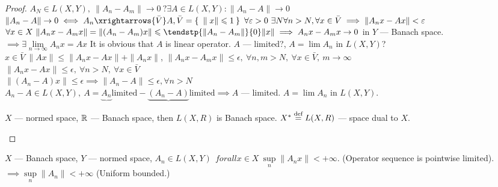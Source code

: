 \begin{proof}
  $A_N \in  L(X ,Y),\ \|A_n - A_m\| \to 0\ ?\exists A \in L(X, Y): \|A_n - A\|
  \to 0$ \\
  $\|A_n - A\| \to 0 \iff A_n \xrightarrows{\bar{V}} A, \bar{V} = \Set{\|x\| \leq
    1}\ \forall \epsilon > 0\ \exists N \forall n > N, \forall x \in \bar{V}
  \implies \|A_nx - Ax\| < \epsilon$ \\
  $\forall x \in X\ \|A_nx - A_mx\| = \|(A_n - A_m)x\| \leq \tendstp{\|A_n - A_m\|}{0} \|x\|
  \implies A_nx - A_mx \to 0$ in $Y$ --- Banach space.
  $\implies \exists \lim\limits_{n \to \infty}A_nx = Ax$
  It is obvious that $A$ is linear operator. $A$ --- limited?, $A = \lim A_n$ in
  $L(X, Y)$?  \\
  $x \in \bar{V}\ \|Ax\| \leq \|A_nx - Ax\| + \|A_nx\|$, $\|A_nx - A_mx\| \leq
  \epsilon,\ \forall n, m > N,\ \forall x \in \bar{V},\ m \to \infty$\\
  $\|A_nx - Ax\| \leq \epsilon,\ \forall n > N,\ \forall x \in \bar{V}$ \\
  $\|(A_n - A)x\| \leq \epsilon \implies \|A_n - A\| \leq \epsilon, \forall n > N$ \\
  $A_n - A \in L(X, Y),\ A = \underbrace{A_n}{\text{limited}} - \underbrace{(A_n -
    A)}{\text{limited}} \implies A$ --- limited.
  $A = \lim A_n$ in $L(X, Y)$.
  \begin{note}
    $X$ --- normed space, $\mathbb{R}$ --- Banach space, then $L(X, R)$ is Banach space.
    $X^{*} \overset{\text{def}}{=} L(X, R)$ --- space dual to $X$.
  \end{note}
\end{proof}

\begin{thm}
  $X$ --- Banach space, $Y$ --- normed space, $A_n \in L(X, Y)\ \ forall x \in
  X\ \sup\limits_n\|A_nx\| < +\infty$. (Operator sequence is pointwise
  limited).
  $\implies \sup\limits_n\|A_n\| < +\infty$ (Uniform bounded.)
\end{thm}

